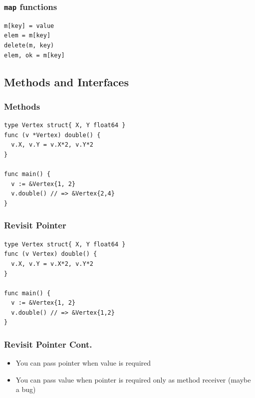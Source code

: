 \documentclass[xetex,mathserif,serif,12pt]{beamer}
\begin{document}
\begin{frame}[fragile]
  \frametitle{\texttt{map} functions}

  \begin{beamer@nomargin}
    \begin{lstlisting}
m[key] = value
elem = m[key]
delete(m, key)
elem, ok = m[key]
    \end{lstlisting}
  \end{beamer@nomargin}
\end{frame}

\subsection{Methods and Interfaces}

\begin{frame}[fragile]
  \frametitle{Methods}

  \begin{beamer@nomargin}
    \begin{lstlisting}
type Vertex struct{ X, Y float64 }
func (v *Vertex) double() {
  v.X, v.Y = v.X*2, v.Y*2
}

func main() {
  v := &Vertex{1, 2}
  v.double() // => &Vertex{2,4}
}
    \end{lstlisting}
  \end{beamer@nomargin}
\end{frame}

\begin{frame}[fragile]
  \frametitle{Revisit Pointer}

  \begin{beamer@nomargin}
    \begin{lstlisting}
type Vertex struct{ X, Y float64 }
func (v Vertex) double() {
  v.X, v.Y = v.X*2, v.Y*2
}

func main() {
  v := &Vertex{1, 2}
  v.double() // => &Vertex{1,2}
}
    \end{lstlisting}
  \end{beamer@nomargin}
\end{frame}

\begin{frame}
  \frametitle{Revisit Pointer Cont.}

  \begin{itemize}
  \item You can pass pointer when value is required
  \item You can pass value when pointer is required only as method receiver (maybe a bug)
  \end{itemize}
\end{frame}
\end{document}
